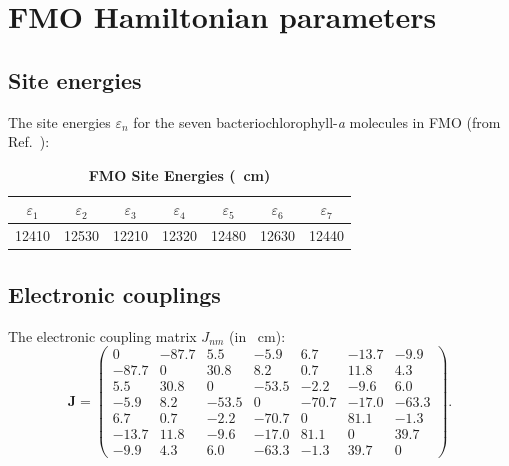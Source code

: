 \documentclass[11pt,a4paper]{article}
\begin{document}

\section{FMO Hamiltonian parameters}

\subsection{Site energies}

The site energies $\varepsilon_n$ for the seven bacteriochlorophyll-\textit{a} molecules in FMO (from Ref.\ \cite{Adolphs2006}):

\begin{table}[h]
\centering
\caption{\textbf{FMO Site Energies (\si{\per\centi\meter})}}
\label{tab:SI_site_energies}
\begin{tabular}{ccccccc}
\toprule
$\varepsilon_1$ & $\varepsilon_2$ & $\varepsilon_3$ & $\varepsilon_4$ & $\varepsilon_5$ & $\varepsilon_6$ & $\varepsilon_7$ \\
\midrule
12410 & 12530 & 12210 & 12320 & 12480 & 12630 & 12440 \\
\bottomrule
\end{tabular}
\end{table}

\subsection{Electronic couplings}

The electronic coupling matrix $J_{nm}$ (in \si{\per\centi\meter}):
\begin{equation}
\mathbf{J} = \begin{pmatrix}
0 & -87.7 & 5.5 & -5.9 & 6.7 & -13.7 & -9.9 \\
-87.7 & 0 & 30.8 & 8.2 & 0.7 & 11.8 & 4.3 \\
5.5 & 30.8 & 0 & -53.5 & -2.2 & -9.6 & 6.0 \\
-5.9 & 8.2 & -53.5 & 0 & -70.7 & -17.0 & -63.3 \\
6.7 & 0.7 & -2.2 & -70.7 & 0 & 81.1 & -1.3 \\
-13.7 & 11.8 & -9.6 & -17.0 & 81.1 & 0 & 39.7 \\
-9.9 & 4.3 & 6.0 & -63.3 & -1.3 & 39.7 & 0
\end{pmatrix}.
\label{eq:SI_coupling_matrix}
\end{equation}
\end{document}
